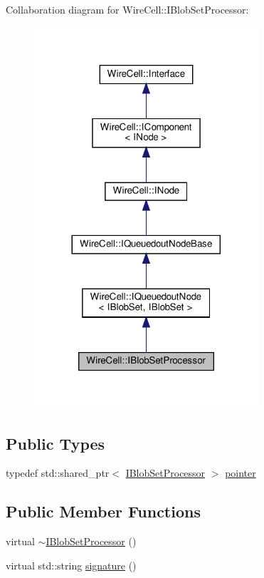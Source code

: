Collaboration diagram for Wire\+Cell\+:\+:I\+Blob\+Set\+Processor\+:
\nopagebreak
\begin{figure}[H]
\begin{center}
\leavevmode
\includegraphics[width=236pt]{class_wire_cell_1_1_i_blob_set_processor__coll__graph}
\end{center}
\end{figure}
\subsection*{Public Types}
\begin{DoxyCompactItemize}
\item 
typedef std\+::shared\+\_\+ptr$<$ \hyperlink{class_wire_cell_1_1_i_blob_set_processor}{I\+Blob\+Set\+Processor} $>$ \hyperlink{class_wire_cell_1_1_i_blob_set_processor_a4e2313738ab615ebf8c64895e1a6f3cc}{pointer}
\end{DoxyCompactItemize}
\subsection*{Public Member Functions}
\begin{DoxyCompactItemize}
\item 
virtual \hyperlink{class_wire_cell_1_1_i_blob_set_processor_a91d0fdcdc0740f4cec3b69a764b2f248}{$\sim$\+I\+Blob\+Set\+Processor} ()
\item 
virtual std\+::string \hyperlink{class_wire_cell_1_1_i_blob_set_processor_a387452d24275fc0ff7d5530ac7b96d85}{signature} ()
\end{DoxyCompactItemize}



